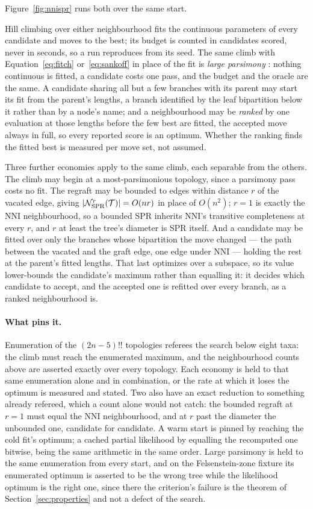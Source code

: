 \documentclass[11pt,a4paper]{article}
\begin{document}
Figure~\ref{fig:nnispr} runs both over the same start.



Hill climbing over either neighbourhood fits the continuous parameters of every
candidate and moves to the best; its budget is counted in candidates scored,
never in seconds, so a run reproduces from its seed. The same climb with
Equation~\ref{eq:fitch} or~\ref{eq:sankoff} in place of the fit is \emph{large
parsimony} \citep{felsenstein2004}: nothing continuous is fitted, a candidate
costs one pass, and the budget and the oracle are the same. A candidate sharing
all but a few branches with its parent may start its fit from the parent's
lengths, a branch identified by the leaf bipartition below it rather than by a
node's name; and a neighbourhood may be \emph{ranked} by one evaluation at
those lengths before the few best are fitted, the accepted move always in full,
so every reported score is an optimum. Whether the ranking finds the fitted
best is measured per move set, not assumed.

Three further economies apply to the same climb, each separable from the
others. The climb may begin at a most-parsimonious topology, since a parsimony
pass costs no fit. The regraft may be bounded
to edges within distance $r$ of the vacated edge, giving
$|\mathcal{N}_{\mathrm{SPR}}^{r}(\mathcal{T})| = O(nr)$ in place of $O(n^2)$;
$r=1$ is exactly the NNI neighbourhood, so a bounded SPR inherits NNI's
transitive completeness at every $r$, and $r$ at least the tree's diameter is
SPR itself. And a candidate may be fitted over only the branches whose
bipartition the move changed --- the path between the vacated and the graft
edge, one edge under NNI --- holding the rest at the parent's fitted lengths.
That last optimizes over a subspace, so its value lower-bounds the candidate's
maximum rather than equalling it: it decides which candidate to accept, and the
accepted one is refitted over every branch, as a ranked neighbourhood is.

\paragraph{What pins it.}
Enumeration of the $(2n-5)!!$ topologies referees the search below eight taxa:
the climb must reach the enumerated maximum, and the neighbourhood counts
above are asserted exactly over every topology. Each economy is held to that
same enumeration alone and in combination, or the rate at which it loses the
optimum is measured and stated. Two also have an exact reduction to something
already refereed, which a count alone would not catch: the bounded regraft at
$r=1$ must equal the NNI neighbourhood, and at $r$ past the diameter the
unbounded one, candidate for candidate. A warm start is pinned by reaching the
cold fit's optimum; a cached partial likelihood by equalling the recomputed one
bitwise, being the same arithmetic in the same order. Large parsimony is held
to the same enumeration from every start, and on the Felsenstein-zone fixture
its enumerated optimum is asserted to be the wrong tree while the likelihood
optimum is the right one, since there the criterion's failure is the theorem of
Section~\ref{sec:properties} and not a defect of the search.
\end{document}
